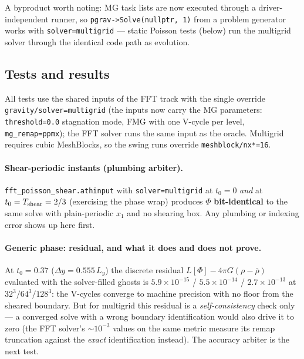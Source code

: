 \documentclass[11pt]{article}
\newcommand{\code}[1]{\texttt{#1}}
\begin{document}
A byproduct worth noting: MG task lists are now executed through a
driver-independent runner, so \code{pgrav->Solve(nullptr,\,1)} from a problem
generator works with \code{solver=multigrid} --- static Poisson tests (below) run
the multigrid solver through the identical code path as evolution.

\subsection{Tests and results}
\label{sec:p1_tests}
All tests use the shared inputs of the FFT track with the single override
\code{gravity/solver=multigrid} (the inputs now carry the MG parameters:
\code{threshold=0.0} stagnation mode, FMG with one V-cycle per level,
\code{mg\_remap=ppmx}); the FFT solver runs the same input as the oracle. Multigrid
requires cubic MeshBlocks, so the swing runs override \code{meshblock/nx*=16}.

\paragraph{Shear-periodic instants (plumbing arbiter).}
\code{fft\_poisson\_shear.athinput} with \code{solver=multigrid} at $t_0 = 0$
\emph{and} at $t_0 = T_{\rm shear} = 2/3$ (exercising the phase wrap) produces
$\Phi$ \textbf{bit-identical} to the same solve with plain-periodic $x_1$ and no
shearing box. Any plumbing or indexing error shows up here first.

\paragraph{Generic phase: residual, and what it does and does not prove.}
At $t_0 = 0.37$ ($\Delta y = 0.555\,L_y$) the discrete residual
$L[\Phi] - 4\pi G(\rho - \bar\rho)$ evaluated with the solver-filled ghosts is
$5.9\times10^{-15}$ / $5.5\times10^{-14}$ / $2.7\times10^{-13}$ at
$32^3/64^3/128^3$: the V-cycles converge to machine precision with no floor from
the sheared boundary. But for multigrid this residual is a \emph{self-consistency}
check only --- a converged solve with a wrong boundary identification would also
drive it to zero (the FFT solver's $\sim10^{-3}$ values on the same metric measure
its remap truncation against the \emph{exact} identification instead). The accuracy
arbiter is the next test.
\end{document}
